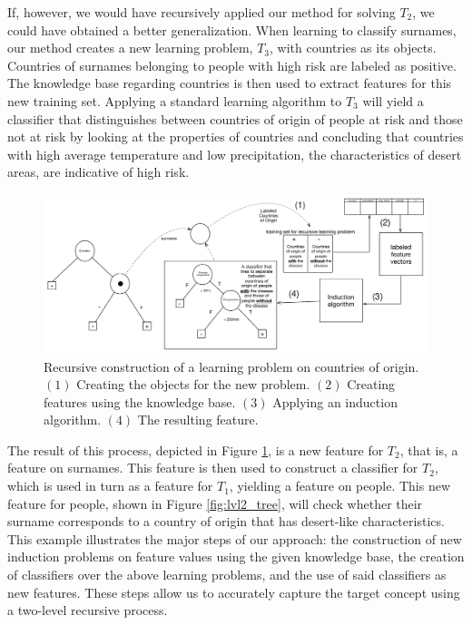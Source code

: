 \documentclass[twoside,11pt]{article}
\theoremstyle{definition}
\begin{document}
If, however, we would have recursively applied our method for solving $T_2$, we could have obtained a better generalization.
When learning to classify surnames, our method creates a new learning problem, $T_3$, with countries as its objects. Countries of surnames belonging to people with high risk are labeled as positive. The knowledge base regarding countries is then used to extract features for this new training set.
Applying a standard learning algorithm to $T_3$ will yield a classifier that distinguishes between countries of origin of people at risk and those not at risk by looking at the properties of countries and concluding that countries with high average temperature and low precipitation, the characteristics of desert areas,  are indicative of high risk. 

\begin{figure}[th]
	\centering
	\includegraphics[width=0.9\linewidth,height=0.33\linewidth]{fig4_annotated.pdf}
	\caption{Recursive construction of a learning problem on countries of origin. $(1)$ Creating the objects for the new problem. $(2)$ Creating features using the knowledge base. $(3)$ Applying an induction algorithm. $(4)$ The resulting feature.}
	\label{fig:moving_to_lvl2}
\end{figure}

 The result of this process, depicted in Figure \ref{fig:moving_to_lvl2}, is a new feature for $T_2$, that is, a feature on surnames. This feature is then used to construct a classifier for $T_2$, which is used in turn as a feature for $T_1$, yielding a feature on people. This new feature for people, shown in Figure \ref{fig:lvl2_tree}, will check whether their surname corresponds to a country of origin that has desert-like characteristics. 
 This example illustrates the major steps of our approach: the construction of new induction problems on feature values using the given knowledge base, the creation of classifiers over the above learning problems, and the use of said classifiers as new features. These steps allow us to accurately capture the target concept using a two-level recursive process.
 
\end{document}
